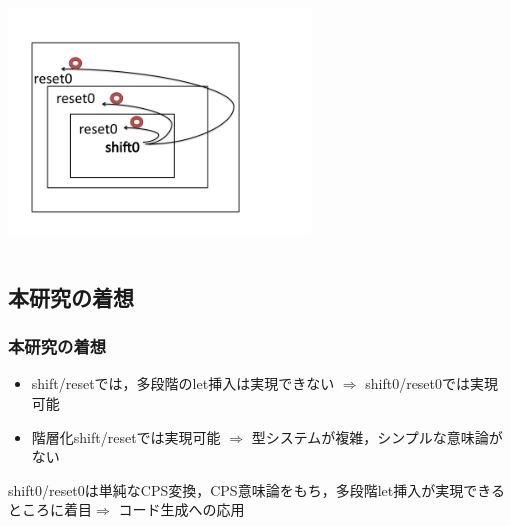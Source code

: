 \documentclass[dvipdfmx,cjk,xcolor=dvipsnames,envcountsect,notheorems,12pt]{beamer}
\theoremstyle{definition}
\begin{document}
\begin{frame}[fragile]
\begin{columns}
    \begin{column}{.5\textwidth}
      \includegraphics[clip,width=8cm]{./img/s0r0.png}
    \end{column}
  \end{columns}


\end{frame}

\subsection{本研究の着想}
\begin{frame}
  \frametitle{本研究の着想}
  \begin{itemize}
  \item shift/resetでは，多段階のlet挿入は実現できない $\Rightarrow$ shift0/reset0では実現可能
  \item 階層化shift/resetでは実現可能 $\Rightarrow$ 型システムが複雑，シンプルな意味論がない
  \end{itemize}

  \pause
  shift0/reset0は単純なCPS変換，CPS意味論をもち，多段階let挿入が実現できるところに着目$\Rightarrow$ コード生成への応用


\end{frame}
\end{document}

